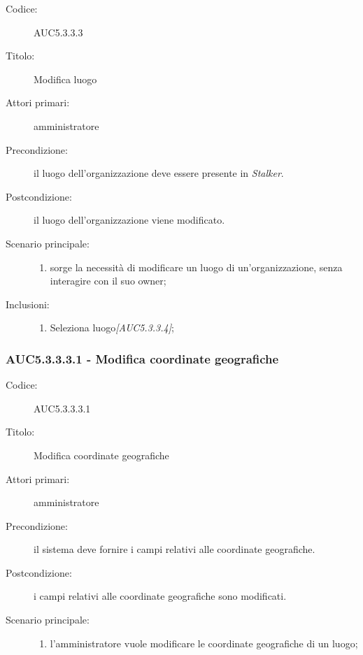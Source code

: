 \documentclass[../../../analisi-dei-requisiti.tex]{subfiles}
\begin{document}
\begin{description}
  \item[Codice:] AUC5.3.3.3
  \item[Titolo:] Modifica luogo
  \item[Attori primari:] amministratore
  \item[Precondizione:] il luogo dell'organizzazione deve essere presente in \emph{Stalker}.
  \item[Postcondizione:] il luogo dell'organizzazione viene modificato.
  \item[Scenario principale:]
  \begin{enumerate}
    \item sorge la necessità di modificare un luogo di un'organizzazione, senza interagire con il suo owner;
  \end{enumerate}
  \item[Inclusioni:]
  \begin{enumerate}
    \item Seleziona luogo\emph{[AUC5.3.3.4]};
  \end{enumerate}
\end{description}

\subsubsection{AUC5.3.3.3.1 - Modifica coordinate geografiche}%
\label{subs:AUC5.3.3.3.1}
\begin{description}
  \item[Codice:] AUC5.3.3.3.1
  \item[Titolo:] Modifica coordinate geografiche
  \item[Attori primari:] amministratore
  \item[Precondizione:] il sistema deve fornire i campi relativi alle coordinate geografiche.
  \item[Postcondizione:] i campi relativi alle coordinate geografiche sono modificati.
  \item[Scenario principale:]
  \begin{enumerate}
    \item l'amministratore vuole modificare le coordinate geografiche di un luogo;
  \end{enumerate}
\end{description}
\end{document}
